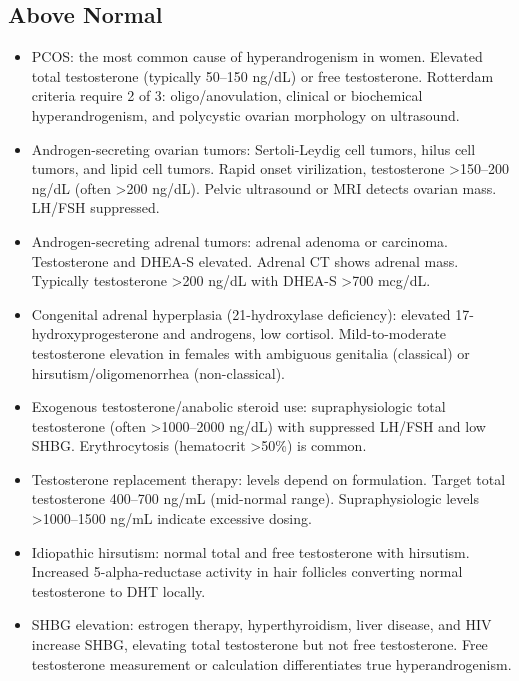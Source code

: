 \subsection*{Above Normal}
\begin{itemize}
  \item PCOS: the most common cause of hyperandrogenism in women. Elevated total testosterone (typically 50--150 ng/dL) or free testosterone. Rotterdam criteria require 2 of 3: oligo/anovulation, clinical or biochemical hyperandrogenism, and polycystic ovarian morphology on ultrasound.
  \item Androgen-secreting ovarian tumors: Sertoli-Leydig cell tumors, hilus cell tumors, and lipid cell tumors. Rapid onset virilization, testosterone >150--200 ng/dL (often >200 ng/dL). Pelvic ultrasound or MRI detects ovarian mass. LH/FSH suppressed.
  \item Androgen-secreting adrenal tumors: adrenal adenoma or carcinoma. Testosterone and DHEA-S elevated. Adrenal CT shows adrenal mass. Typically testosterone >200 ng/dL with DHEA-S >700 mcg/dL.
  \item Congenital adrenal hyperplasia (21-hydroxylase deficiency): elevated 17-hydroxyprogesterone and androgens, low cortisol. Mild-to-moderate testosterone elevation in females with ambiguous genitalia (classical) or hirsutism/oligomenorrhea (non-classical).
  \item Exogenous testosterone/anabolic steroid use: supraphysiologic total testosterone (often >1000--2000 ng/dL) with suppressed LH/FSH and low SHBG. Erythrocytosis (hematocrit >50\%) is common.
  \item Testosterone replacement therapy: levels depend on formulation. Target total testosterone 400--700 ng/mL (mid-normal range). Supraphysiologic levels >1000--1500 ng/mL indicate excessive dosing.
  \item Idiopathic hirsutism: normal total and free testosterone with hirsutism. Increased 5-alpha-reductase activity in hair follicles converting normal testosterone to DHT locally.
  \item SHBG elevation: estrogen therapy, hyperthyroidism, liver disease, and HIV increase SHBG, elevating total testosterone but not free testosterone. Free testosterone measurement or calculation differentiates true hyperandrogenism.
\end{itemize}


